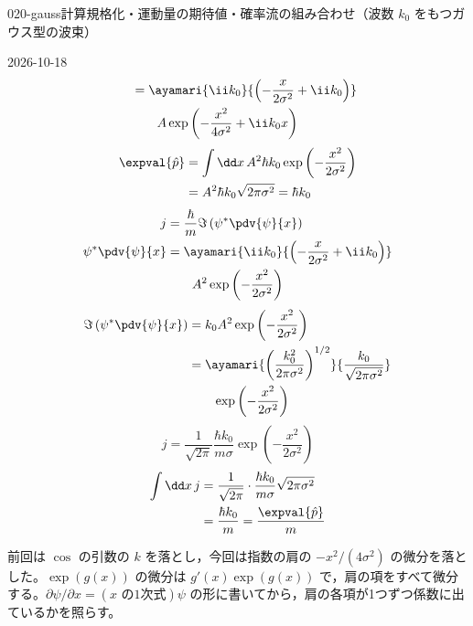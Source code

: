 \documentclass[uplatex,dvipdfmx,a4paper,11pt]{jsarticle}
\begin{document}
\begin{mondai}{020-gauss}{計算}{規格化・運動量の期待値・確率流の組み合わせ（波数 $k_{0}$ をもつガウス型の波束）}
\begin{kotaeutsushi}{2026-10-18}
\begin{align*}
&\quad=\ayamari{\ii k_{0}}{\left(-\frac{x}{2\sigma^{2}}+\ii k_{0}\right)}\\
&\qquad\quad A\exp\left(-\frac{x^{2}}{4\sigma^{2}}+\ii k_{0}x\right)
\end{align*}
\begin{align*}
\expval{\hat{p}}&=\int\dd x\,A^{2}\hbar k_{0}\exp\left(-\frac{x^{2}}{2\sigma^{2}}\right)\\
&=A^{2}\hbar k_{0}\sqrt{2\pi\sigma^{2}}=\hbar k_{0}
\end{align*}
\begin{align*}
j&=\frac{\hbar}{m}\Im\left(\psi^{*}\pdv{\psi}{x}\right)\\
\psi^{*}\pdv{\psi}{x}&=\ayamari{\ii k_{0}}{\left(-\frac{x}{2\sigma^{2}}+\ii k_{0}\right)}\\
&\qquad A^{2}\exp\left(-\frac{x^{2}}{2\sigma^{2}}\right)
\end{align*}
\begin{align*}
\Im\left(\psi^{*}\pdv{\psi}{x}\right)&=k_{0}A^{2}\exp\left(-\frac{x^{2}}{2\sigma^{2}}\right)\\
&=\ayamari{\left(\frac{k_{0}^{2}}{2\pi\sigma^{2}}\right)^{1/2}}{\frac{k_{0}}{\sqrt{2\pi\sigma^{2}}}}\\
&\qquad\exp\left(-\frac{x^{2}}{2\sigma^{2}}\right)
\end{align*}
\[ j=\frac{1}{\sqrt{2\pi}}\frac{\hbar k_{0}}{m\sigma}\exp\left(-\frac{x^{2}}{2\sigma^{2}}\right) \]
\begin{align*}
\int\dd x\,j&=\frac{1}{\sqrt{2\pi}}\cdot\frac{\hbar k_{0}}{m\sigma}\sqrt{2\pi\sigma^{2}}\\
&=\frac{\hbar k_{0}}{m}=\frac{\expval{\hat{p}}}{m}
\end{align*}
\end{kotaeutsushi}
\begin{kizuki}
\item {} 前回は $\cos$ の引数の $k$ を落とし，今回は指数の肩の $-x^{2}/(4\sigma^{2})$ の微分を落とした。$\exp(g(x))$ の微分は $g'(x)\exp(g(x))$ で，肩の項をすべて微分する。$\partial\psi/\partial x=(\text{$x$ の1次式})\psi$ の形に書いてから，肩の各項が1つずつ係数に出ているかを照らす。

\end{kizuki}
\end{mondai}
\end{document}
